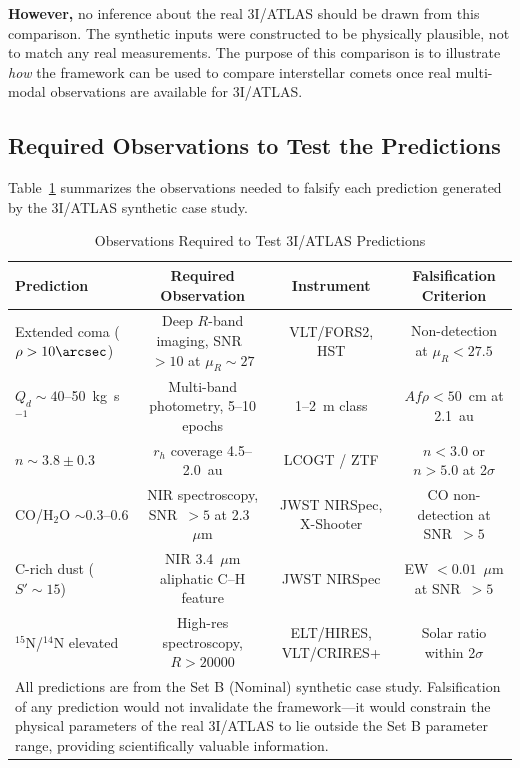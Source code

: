 \documentclass[usenatbib]{mnras}
\begin{document}
\textbf{However,} no inference about the real 3I/ATLAS should be drawn from this comparison. The synthetic inputs were constructed to be physically plausible, not to match any real measurements. The purpose of this comparison is to illustrate \textit{how} the framework can be used to compare interstellar comets once real multi-modal observations are available for 3I/ATLAS.

\subsection{Required Observations to Test the Predictions}

Table~\ref{tab:required_obs} summarizes the observations needed to falsify each prediction generated by the 3I/ATLAS synthetic case study.

\begin{table}
\centering
\caption{Observations Required to Test 3I/ATLAS Predictions\label{tab:required_obs}}
\begin{tabular}{lccc}
\toprule
Prediction & Required Observation & Instrument & Falsification Criterion \\
\midrule
Extended coma ($\rho > 10\arcsec$) & Deep $R$-band imaging, SNR~$>10$ at $\mu_R \sim 27$ & VLT/FORS2, HST & Non-detection at $\mu_R < 27.5$ \\
$Q_d \sim 40$--50~kg~s$^{-1}$ & Multi-band photometry, 5--10 epochs & 1--2~m class & $Af\rho < 50$~cm at 2.1~au \\
$n \sim 3.8 \pm 0.3$ & $r_h$ coverage 4.5--2.0~au & LCOGT / ZTF & $n < 3.0$ or $n > 5.0$ at 2$\sigma$ \\
CO/H$_2$O $\sim 0.3$--0.6 & NIR spectroscopy, SNR~$>5$ at 2.3~$\mu$m & JWST NIRSpec, X-Shooter & CO non-detection at SNR~$>5$ \\
C-rich dust ($S' \sim 15$) & NIR 3.4~$\mu$m aliphatic C--H feature & JWST NIRSpec & EW $< 0.01$~$\mu$m at SNR~$>5$ \\
$^{15}$N/$^{14}$N elevated & High-res spectroscopy, $R > 20000$ & ELT/HIRES, VLT/CRIRES+ & Solar ratio within 2$\sigma$ \\
\bottomrule
\multicolumn{4}{l}{\small All predictions are from the Set B (Nominal) synthetic case study. Falsification of any prediction would not invalidate the framework---it would constrain the physical parameters of the real 3I/ATLAS to lie outside the Set B parameter range, providing scientifically valuable information.}
\end{tabular}
\end{table}
\end{document}
